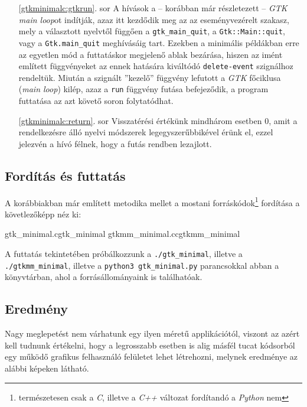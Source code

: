 \begin{enumerate}
 \item[\ref{gtkminimalc:gtkrun}. sor] A hívások a -- korábban már részletezett -- \textit{GTK main loop}ot indítják, azaz itt kezdődik meg az az eseményvezérelt szakasz, mely a választott nyelvtől függően a \texttt{gtk\_main\_quit}, a \texttt{Gtk::Main::quit}, vagy a \texttt{Gtk.main\_quit} meghívásáig tart. Ezekben a minimális példákban erre az egyetlen mód a futtatáskor megjelenő ablak bezárása, hiszen az imént említett függvényeket az ennek hatására kiváltódó \texttt{delete-event} szignálhoz rendeltük.  Miután a szignált ''kezelő'' függvény lefutott a \textit{GTK} főciklusa (\textit{main loop}) kilép, azaz a \texttt{run} függvény futása befejeződik, a program futtatása az azt követő soron folytatódhat.

 \item[\ref{gtkminimalc:return}. sor] Visszatérési értékünk mindhárom esetben 0, amit a rendelkezésre álló nyelvi módszerek legegyszerűbbikével érünk el, ezzel jelezvén a hívó félnek, hogy a futás rendben lezajlott.
\end{enumerate}

\subsection{Fordítás és futtatás}

A korábbiakban már említett metodika mellet a mostani forráskódok\footnote{természetesen csak a \textit{C}, illetve a \textit{C++} változat fordítandó a \textit{Python} nem} fordítása a követlezőképp néz ki:

\lstcompiles
{gtk_minimal.c}{gtk_minimal}
{gtkmm_minimal.cc}{gtkmm_minimal}

A futtatás tekintetében próbálkozzunk a \texttt{./gtk\_minimal}, illetve a \texttt{./gtkmm\_minimal}, illetve a \texttt{python3 gtk\_minimal.py} parancsokkal abban a könyvtárban, ahol a forrásállományaink is találhatóak.

\subsection{Eredmény}

Nagy meglepetést nem várhatunk egy ilyen méretű applikációtól, viszont az azért kell tudnunk értékelni, hogy a legrosszabb esetben is alig másfél tucat kódsorból egy működő grafikus felhasználó felületet lehet létrehozni, melynek eredménye az alábbi képeken látható.


